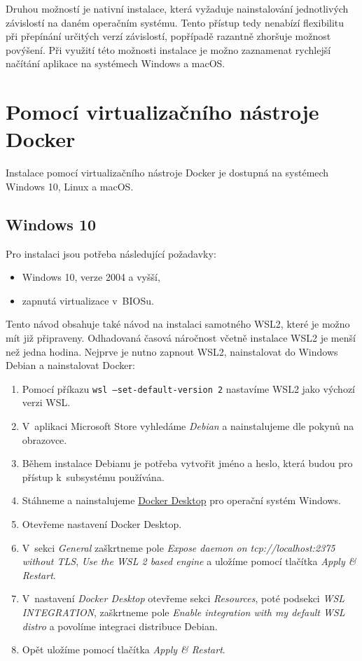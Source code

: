 \documentclass[czech,master]{diploma}
\begin{document}
Druhou možností je nativní instalace, která vyžaduje nainstalování jednotlivých závislostí na daném operačním systému. Tento přístup tedy nenabízí flexibilitu při přepínání určitých verzí závislostí, popřípadě razantně zhoršuje možnost povýšení. Při využití této možnosti instalace je možno zaznamenat rychlejší načítání aplikace na systémech Windows a macOS.

\section{Pomocí virtualizačního nástroje Docker}
Instalace pomocí virtualizačního nástroje Docker je dostupná na systémech Windows 10, Linux a macOS.

\subsection{Windows 10}
Pro instalaci jsou potřeba následující požadavky:
\begin{itemize}
\item Windows 10, verze 2004 a vyšší,
\item zapnutá virtualizace v~BIOSu.
\end{itemize}

Tento návod obsahuje také návod na instalaci samotného WSL2, které je možno mít již připraveny. Odhadovaná časová náročnost včetně instalace WSL2 je menší než jedna hodina. Nejprve je nutno zapnout WSL2, nainstalovat do Windows Debian a nainstalovat Docker:
\begin{enumerate}
\item Pomocí příkazu \texttt{wsl --set-default-version 2} nastavíme WSL2 jako výchozí verzi WSL.
\item V~aplikaci Microsoft Store vyhledáme \textit{Debian} a nainstalujeme dle pokynů na obrazovce.
\item Během instalace Debianu je potřeba vytvořit jméno a heslo, která budou pro přístup k~subsystému používána.
\item Stáhneme a nainstalujeme \href{https://docs.docker.com/docker-for-windows/install/}{Docker Desktop} pro operační systém Windows.
\item Otevřeme nastavení Docker Desktop.
\item V~sekci \textit{General} zaškrtneme pole \textit{Expose daemon on tcp://localhost:2375 without TLS}, \textit{Use the WSL 2 based engine} a uložíme pomocí tlačítka \textit{Apply \& Restart}.
\item V~nastavení \textit{Docker Desktop} otevřeme sekci \textit{Resources}, poté podsekci \textit{WSL INTEGRATION}, zaškrtneme pole \textit{Enable integration with my default WSL distro} a povolíme integraci distribuce Debian.
\item Opět uložíme pomocí  tlačítka \textit{Apply \& Restart}.
\end{enumerate}
\end{document}
